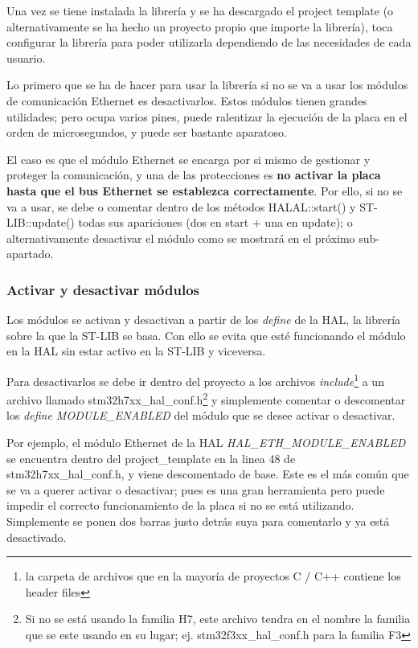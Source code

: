 \documentclass{report}
\begin{document}
Una vez se tiene instalada la librería y se ha descargado el project template (o alternativamente se ha hecho un proyecto propio que importe la librería), toca configurar la librería para poder utilizarla dependiendo de las necesidades de cada usuario. \par \vspace{0.3cm}

Lo primero que se ha de hacer para usar la librería si no se va a usar los módulos de comunicación Ethernet es desactivarlos. Estos módulos tienen grandes utilidades; pero ocupa varios pines, puede ralentizar la ejecución de la placa en el orden de microsegundos, y puede ser bastante aparatoso. \par
El caso es que el módulo Ethernet se encarga por si mismo de gestionar y proteger la comunicación, y una de las protecciones es \textbf{no activar la placa hasta que el bus Ethernet se establezca correctamente}. Por ello, si no se va a usar, se debe o comentar dentro de los métodos HALAL::start() y ST-LIB::update() todas sus apariciones (dos en start + una en update); o alternativamente desactivar el módulo como se mostrará en el próximo sub-apartado. 

\subsubsection{Activar y desactivar módulos}
Los módulos se activan y desactivan a partir de los \textit{define} de la HAL, la librería sobre la que la ST-LIB se basa. Con ello se evita que esté funcionando el módulo en la HAL sin estar activo en la ST-LIB y viceversa. 
\par \vspace{0.3cm}

Para desactivarlos se debe ir dentro del proyecto a los archivos \textit{include}\footnote{la carpeta de archivos que en la mayoría de proyectos C / C++ contiene los header files} a un archivo llamado stm32h7xx\_hal\_conf.h\footnote{Si no se está usando la familia H7, este archivo tendra en el nombre la familia que se este usando en su lugar; ej. stm32f3xx\_hal\_conf.h para la familia F3} y simplemente comentar o descomentar los \textit{define MODULE\_ENABLED} del módulo que se desee activar o desactivar. 
\par \vspace{0.3cm}

Por ejemplo, el módulo Ethernet de la HAL \textit{HAL\_ETH\_MODULE\_ENABLED} se encuentra dentro del project\_template en la linea 48 de stm32h7xx\_hal\_conf.h, y viene descomentado de base. Este es el más común que se va a querer activar o desactivar; pues es una gran herramienta pero puede impedir el correcto funcionamiento de la placa si no se está utilizando. Simplemente se ponen dos barras justo detrás suya para comentarlo y ya está desactivado.
\end{document}
